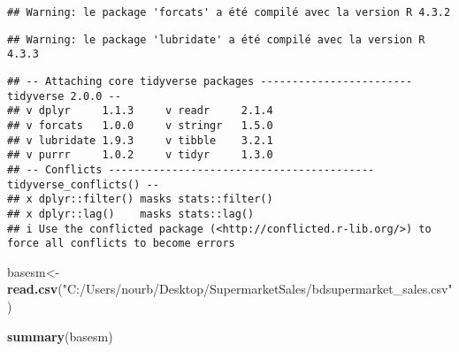 \documentclass[
]{article}
\newenvironment{Shaded}{\begin{snugshade}}{\end{snugshade}}
\newcommand{\FunctionTok}[1]{\textcolor[rgb]{0.13,0.29,0.53}{\textbf{#1}}}
\newcommand{\NormalTok}[1]{#1}
\newcommand{\OtherTok}[1]{\textcolor[rgb]{0.56,0.35,0.01}{#1}}
\newcommand{\StringTok}[1]{\textcolor[rgb]{0.31,0.60,0.02}{#1}}
\begin{document}
\begin{verbatim}
## Warning: le package 'forcats' a été compilé avec la version R 4.3.2
\end{verbatim}

\begin{verbatim}
## Warning: le package 'lubridate' a été compilé avec la version R 4.3.3
\end{verbatim}

\begin{verbatim}
## -- Attaching core tidyverse packages ------------------------ tidyverse 2.0.0 --
## v dplyr     1.1.3     v readr     2.1.4
## v forcats   1.0.0     v stringr   1.5.0
## v lubridate 1.9.3     v tibble    3.2.1
## v purrr     1.0.2     v tidyr     1.3.0
## -- Conflicts ------------------------------------------ tidyverse_conflicts() --
## x dplyr::filter() masks stats::filter()
## x dplyr::lag()    masks stats::lag()
## i Use the conflicted package (<http://conflicted.r-lib.org/>) to force all conflicts to become errors
\end{verbatim}

\begin{Shaded}
\begin{Highlighting}[]
\NormalTok{basesm}\OtherTok{\textless{}{-}}\FunctionTok{read.csv}\NormalTok{(}\StringTok{"C:/Users/nourb/Desktop/SupermarketSales/bdsupermarket\_sales.csv"}\NormalTok{)}



\FunctionTok{summary}\NormalTok{(basesm)}
\end{Highlighting}
\end{Shaded}
\end{document}
